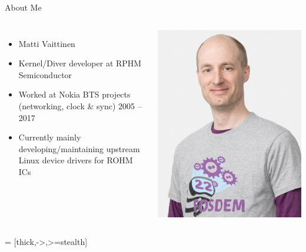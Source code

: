\documentclass[10pt]{beamer}
\begin{document}
\begin{frame}{About Me}
	\begin{columns}
		\begin{itemize}
			\item Matti Vaittinen
			\item Kernel/Diver developer at RPHM Semiconductor
			\item Worked at Nokia BTS projects (networking, clock \& sync) 2005 – 2017
			\item Currently mainly developing/maintaining upstream Linux device drivers for ROHM ICs
		\end{itemize}
		\includegraphics[width=1\linewidth]{me.png}
	\end{columns}
\end{frame}


 = [thick,->,>=stealth]
\end{document}
